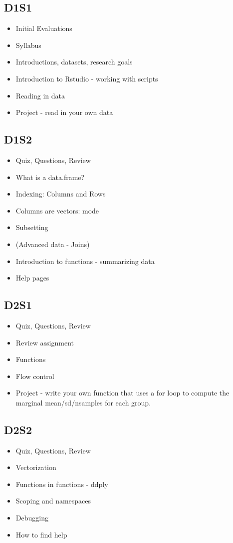 \documentclass[english, letterpaper, 12pt]{article}
\begin{document}
\subsection*{D1S1}
\begin{itemize}
    \item  Initial Evaluations
    \item  Syllabus
    \item  Introductions, datasets, research goals
    \item  Introduction to Rstudio - working with scripts
    \item  Reading in data
    \item  Project - read in your own data
\end{itemize}
\subsection*{D1S2}
\begin{itemize}
    \item  Quiz, Questions, Review
    \item  What is a data.frame?
    \item  Indexing: Columns and Rows
    \item  Columns are vectors: mode 
    \item  Subsetting
    \item  (Advanced data - Joins)
    \item  Introduction to functions - summarizing data
    \item  Help pages
\end{itemize}

\subsection*{D2S1}
\begin{itemize}
    \item Quiz, Questions, Review
    \item Review assignment
    \item Functions
    \item Flow control
    \item Project - write your own function that uses a for loop to compute the
marginal mean/sd/nsamples for each group.
\end{itemize}
\subsection*{D2S2}
\begin{itemize}
    \item Quiz, Questions, Review
    \item Vectorization
    \item Functions in functions - ddply
    \item Scoping and namespaces
    \item Debugging
    \item How to find help
\end{itemize}
\end{document}
